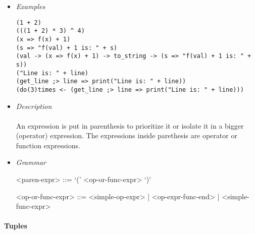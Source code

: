 \documentclass{article}
\begin{document}
\begin{itemize}

\item \textit{Examples}
\begin{verbatim}
(1 + 2)
(((1 + 2) * 3) ^ 4)
(x => f(x) + 1)
(s => "f(val) + 1 is: " + s)
(val -> (x => f(x) + 1) -> to_string -> (s => "f(val) + 1 is: " + s))
("Line is: " + line)
(get_line ;> line => print("Line is: " + line))
(do(3)times <- (get_line ;> line => print("Line is: " + line)))
\end{verbatim}

\item \textit{Description} \\\\
An expression is put in parenthesis to prioritize it or isolate it in a bigger
(operator) expression. The expressions inside parethesis are operator
or function expressions.

\item \textit{Grammar}
\begin{grammar}
<paren-expr> ::= `(' <op-or-func-expr> `)'  

<op-or-func-expr> ::=
<simple-op-expr> | <op-expr-func-end> | <simple-func-expr>
\end{grammar}

\end{itemize}

\paragraph{Tuples}
\end{document}
